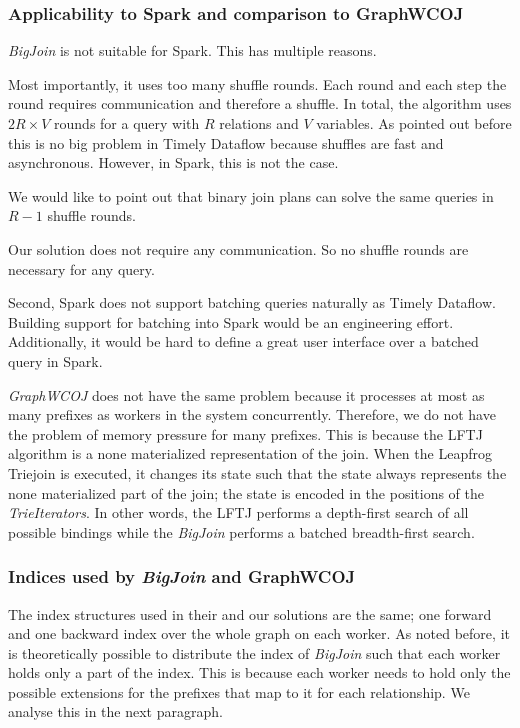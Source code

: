 \subsubsection{Applicability to Spark and comparison to GraphWCOJ}
\textit{BigJoin} is not suitable for Spark.
This has multiple reasons.

Most importantly, it uses too many shuffle rounds.
Each round and each step the round requires communication and therefore a shuffle.
In total, the algorithm uses $2R \times V$ rounds for a query with $R$ relations and $V$ variables.
As pointed out before this is no big problem in Timely Dataflow because shuffles are fast and asynchronous.
However, in Spark, this is not the case.

We would like to point out that binary join plans can solve the same queries in $R - 1$ shuffle rounds.

Our solution does not require any communication.
So no shuffle rounds are necessary for any query.

Second, Spark does not support batching queries naturally as Timely Dataflow.
Building support for batching into Spark would be an engineering effort.
Additionally, it would be hard to define a great user interface over a batched query in Spark.

\textit{GraphWCOJ} does not have the same problem because it processes at most as many prefixes as workers in the system concurrently.
Therefore, we do not have the problem of memory pressure for many prefixes.
This is because the \textsc{LFTJ} algorithm is a none materialized representation of the join.
When the Leapfrog Triejoin is executed, it changes its state such that the state always represents the none materialized
part of the join;
the state is encoded in the positions of the \textit{TrieIterators}.
In other words, the \textsc{LFTJ} performs a depth-first search of all possible bindings while the \textit{BigJoin}
performs a batched breadth-first search.

\subsubsection{Indices used by \textit{BigJoin} and GraphWCOJ}
The index structures used in their and our solutions are the same; one forward and one backward index over the whole graph on each
worker.
As noted before, it is theoretically possible to distribute the index of \textit{BigJoin} such that each worker holds only a part
of the index.
This is because each worker needs to hold only the possible extensions for the prefixes that map to it for each relationship.
We analyse this in the next paragraph.


